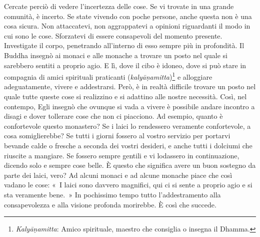 Cercate perciò di vedere l'incertezza delle cose. Se vi trovate in una
grande comunità, è incerto. Se state vivendo con poche persone, anche
questa non è una cosa sicura. Non attaccatevi, non aggrappatevi a
opinioni riguardanti il modo in cui sono le cose. Sforzatevi di essere
consapevoli del momento presente. Investigate il corpo, penetrando
all'interno di esso sempre più in profondità. Il Buddha insegnò ai
monaci e alle monache a trovare un posto nel quale si sarebbero sentiti
a proprio agio. E lì, dove il cibo è idoneo, dove si può stare in
compagnia di amici spirituali praticanti
(\emph{kalyāṇamitta})\footnote{%
  \emph{Kalyāṇamitta}: Amico spirituale, maestro che consiglia o insegna il
  Dhamma.}
e alloggiare adeguatamente, vivere e addestrarsi. Però, è in realtà
difficile trovare un posto nel quale tutte queste cose si realizzino e
si adattino alle nostre necessità. Così, nel contempo, Egli insegnò che
ovunque si vada a vivere è possibile andare incontro a disagi e dover
tollerare cose che non ci piacciono. Ad esempio, quanto è confortevole
questo monastero? Se i laici lo rendessero veramente confortevole, a
cosa somiglierebbe? Se tutti i giorni fossero al vostro servizio per
portarvi bevande calde o fresche a seconda dei vostri desideri, e anche
tutti i dolciumi che riuscite a mangiare. Se fossero sempre gentili e vi
lodassero in continuazione, dicendo solo e sempre cose belle. È questo
che significa avere un buon sostegno da parte dei laici, vero? Ad alcuni
monaci e ad alcune monache piace che così vadano le cose: «~I laici sono
davvero magnifici, qui ci si sente a proprio agio e si sta veramente
bene.~» In pochissimo tempo tutto l'addestramento alla consapevolezza e
alla visione profonda morirebbe. È così che succede.

